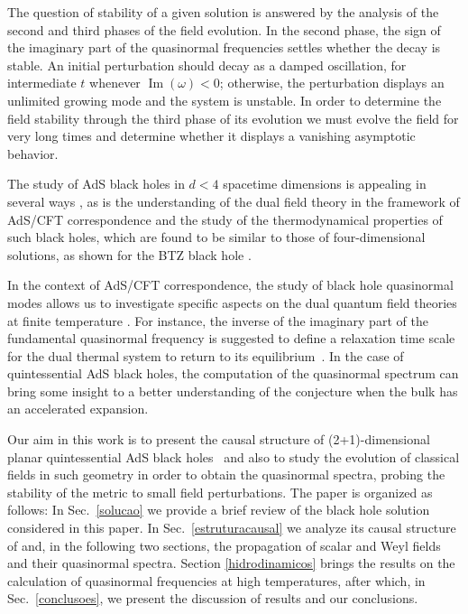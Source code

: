 \documentclass[preprint]{revtex4-1}
\renewcommand{\Im}{\operatorname{Im}}
\begin{document}
The question of stability of a given solution is answered by the analysis of the second and third phases of the field evolution. In the second phase, the sign of the imaginary part of the quasinormal frequencies settles whether the decay is stable. An initial perturbation should decay as a damped oscillation, for intermediate $t$ whenever $\Im(\omega)<0$; otherwise, the perturbation displays an unlimited growing mode and the system is unstable. In order to determine the field stability through the third phase of its evolution we must evolve the field for very long times and determine whether it displays a vanishing asymptotic behavior.

The study of AdS black holes in $d< 4$ spacetime dimensions is appealing in several ways \cite{PhysRevLett.69.1849} \cite{lemos2} \cite{Sa:1996ty}, as is the understanding of the dual field theory in the framework of AdS/CFT correspondence \cite{Son:2002sd} \cite{Abdalla:2011fd} and the study of the thermodynamical properties of such black holes, which are found to be similar to those of four-dimensional solutions, as shown for the BTZ black hole \cite{PhysRevD.47.3319} \cite{Brown:1994gs}.

In the context of AdS/CFT correspondence, the study of black hole quasinormal modes allows us to investigate specific aspects on the dual quantum field theories at finite temperature \cite{Maldacena:1997re} \cite{Witten:1998qj}. For instance, the inverse of the imaginary part of the fundamental quasinormal frequency is suggested to define a relaxation time scale for the dual thermal system to return to its equilibrium~\cite{Horowitz:1999jd}. In the case of quintessential AdS black holes, the computation of the quasinormal spectrum can bring some insight to a better understanding of the conjecture when the bulk has an accelerated expansion.

Our aim in this work is to present the causal structure of (2+1)-dimensional planar quintessential AdS black holes~\cite{Chen:2012mva} and also to study the evolution of classical fields in such geometry in order to obtain the quasinormal spectra, probing the stability of the metric to small field perturbations. The paper is organized as follows: In Sec.~\ref{solucao} we provide a brief review of the black hole solution considered in this paper. In Sec.~\ref{estruturacausal} we analyze its causal structure of and, in the following two sections, the propagation of scalar and Weyl fields and their quasinormal spectra. Section \ref{hidrodinamicos} brings the results on the calculation of quasinormal frequencies at high temperatures, after which, in Sec.~\ref{conclusoes}, we present the discussion of results and our conclusions.
\end{document}
